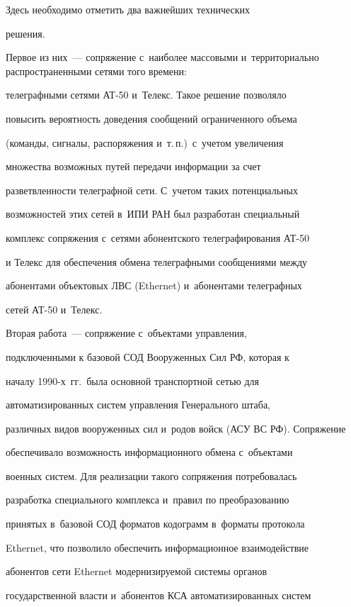      Здесь необходимо отметить два важнейших технических


решения.





     Первое из них~--- сопряжение с~наиболее массовыми и~территориально распространенными сетями того времени:


телеграфными сетями АТ-50 и~Телекс. Такое решение позволяло


повысить вероятность доведения сообщений ограниченного объема


(команды, сигналы, распоряжения и~т.\,п.)\ с~учетом увеличения


множества возможных путей передачи информации за счет


разветвленности телеграфной сети. С~учетом таких потенциальных


возможностей этих сетей в~ИПИ РАН был разработан специальный


комплекс сопряжения с~сетями абонентского телеграфирования АТ-50


и Телекс для обеспечения обмена телеграфными сообщениями между


абонентами объектовых ЛВС (Ethernet) и~абонентами телеграфных


сетей АТ-50 и~Телекс.





     Вторая работа~--- сопряжение с~объектами управления,


подключенными к базовой СОД Вооруженных Сил РФ, которая к


началу 1990-х~гг.\ была основной транспортной сетью для


автоматизированных систем управления Генерального штаба,


различных видов вооруженных сил и~родов войск (АСУ ВС РФ). Сопряжение


обеспечивало возможность информационного обмена с~объектами


военных систем. Для реализации такого сопряжения потребовалась


разработка специального комплекса и~правил по преобразованию


принятых в~базовой СОД форматов кодограмм в~форматы протокола


Ethernet, что позволило обеспечить информационное взаимодействие


абонентов сети Ethernet модернизируемой системы органов


государственной власти и~абонентов КСА автоматизированных систем


